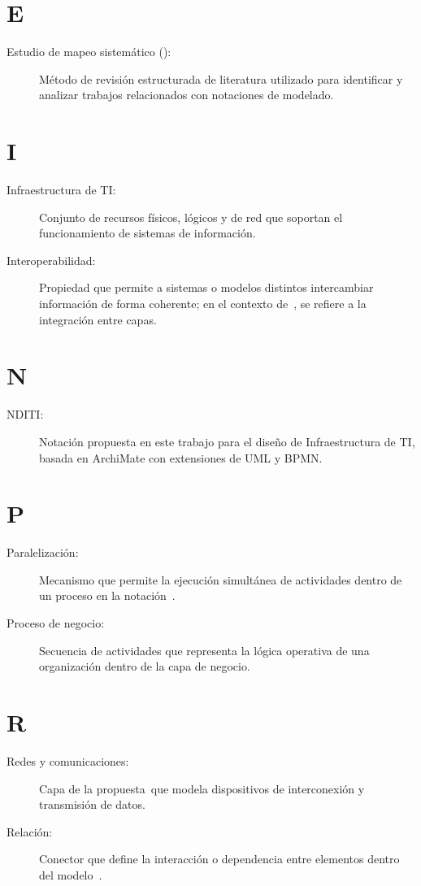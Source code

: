 \section*{E}
\begin{description}
	\item[Estudio de mapeo sistemático (\SMS):] Método de revisión estructurada de literatura utilizado para identificar y analizar trabajos relacionados con notaciones de modelado.
\end{description}

\section*{I}
\begin{description}
	\item[Infraestructura de TI:] Conjunto de recursos físicos, lógicos y de red que soportan el funcionamiento de sistemas de información.

	\item[Interoperabilidad:] Propiedad que permite a sistemas o modelos distintos intercambiar información de forma coherente; en el contexto de~\NDITI{}, se refiere a la integración entre capas.
\end{description}

\section*{N}
\begin{description}
	\item[NDITI:] Notación propuesta en este trabajo para el diseño de Infraestructura de TI, basada en ArchiMate con extensiones de UML y BPMN.
\end{description}

\section*{P}
\begin{description}
	\item[Paralelización:] Mecanismo que permite la ejecución simultánea de actividades dentro de un proceso en la notación~\NDITI.

	\item[Proceso de negocio:] Secuencia de actividades que representa la lógica operativa de una organización dentro de la capa de negocio.
\end{description}

\section*{R}
\begin{description}
	\item[Redes y comunicaciones:] Capa de la propuesta~\NDITI que modela dispositivos de interconexión y transmisión de datos.

	\item[Relación:] Conector que define la interacción o dependencia entre elementos dentro del modelo~\NDITI.
\end{description}

